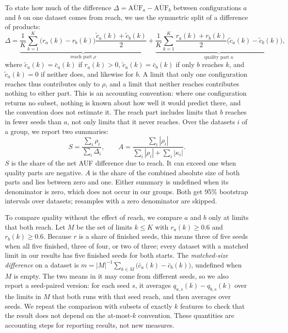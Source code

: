 To state how much of the difference $\Delta = \overline{\mathrm{AUF}}_a - \overline{\mathrm{AUF}}_b$ between configurations $a$ and $b$ on one dataset comes from reach, we use the symmetric split of a difference of products:
\begin{equation}
  \Delta = \underbrace{\frac{1}{K}\sum_{k=1}^{K} \bigl(r_a(k) - r_b(k)\bigr)\frac{\tilde{c}_a(k) + \tilde{c}_b(k)}{2}}_{\text{reach part } \rho}
  + \underbrace{\frac{1}{K}\sum_{k=1}^{K} \frac{r_a(k) + r_b(k)}{2}\bigl(\tilde{c}_a(k) - \tilde{c}_b(k)\bigr)}_{\text{quality part } \kappa},
  \label{eq:split}
\end{equation}
where $\tilde{c}_a(k) = \bar{c}_a(k)$ if $r_a(k) > 0$, $\tilde{c}_a(k) = \bar{c}_b(k)$ if only $b$ reaches $k$, and $\tilde{c}_a(k) = 0$ if neither does, and likewise for $b$. A limit that only one configuration reaches thus contributes only to $\rho$, and a limit that neither reaches contributes nothing to either part. This is an accounting convention: where one configuration returns no subset, nothing is known about how well it would predict there, and the convention does not estimate it. The reach part includes limits that $b$ reaches in fewer seeds than $a$, not only limits that it never reaches. Over the datasets $i$ of a group, we report two summaries:
\begin{equation}
  S = \frac{\sum_i \rho_i}{\sum_i \Delta_i},
  \qquad
  A = \frac{\sum_i |\rho_i|}{\sum_i |\rho_i| + \sum_i |\kappa_i|}.
  \label{eq:shares}
\end{equation}
$S$ is the share of the net AUF difference due to reach. It can exceed one when quality parts are negative. $A$ is the share of the combined absolute size of both parts and lies between zero and one. Either summary is undefined when its denominator is zero, which does not occur in our groups. Both get 95\% bootstrap intervals over datasets; resamples with a zero denominator are skipped.

To compare quality without the effect of reach, we compare $a$ and $b$ only at limits that both reach. Let $M$ be the set of limits $k \leq K$ with $r_a(k) \geq 0.6$ and $r_b(k) \geq 0.6$. Because $r$ is a share of finished seeds, this means three of five seeds when all five finished, three of four, or two of three; every dataset with a matched limit in our results has five finished seeds for both starts. The \emph{matched-size difference} on a dataset is $m = |M|^{-1} \sum_{k \in M} \bigl(\bar{c}_a(k) - \bar{c}_b(k)\bigr)$, undefined when $M$ is empty. The two means in it may come from different seeds, so we also report a seed-paired version: for each seed $s$, it averages $q_{a,s}(k) - q_{b,s}(k)$ over the limits in $M$ that both runs with that seed reach, and then averages over seeds. We repeat the comparison with subsets of exactly $k$ features to check that the result does not depend on the at-most-$k$ convention. These quantities are accounting steps for reporting results, not new measures.

